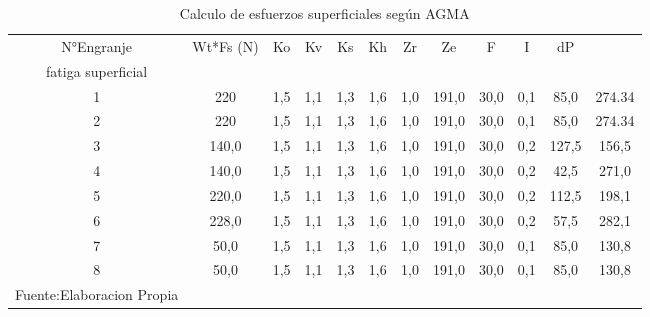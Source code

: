 

\begin{longtable}{|c|c|c|c|c|c|c|c|c|c|c|c|}
\hline
N°Engranje & Wt*Fs (N) & Ko  & Kv  & Ks  & Kh  & Zr  & Ze    & F    & I   & dP    & \begin{tabular}[c]{@{}c@{}}Esfuerzo AGMA\\  fatiga superficial\end{tabular} \\ \hline
1          & 220      & 1,5 & 1,1 & 1,3 & 1,6 & 1,0 & 191,0 & 30,0 & 0,1 & 85,0  & 274.34                                                                       \\ \hline
2          & 220      & 1,5 & 1,1 & 1,3 & 1,6 & 1,0 & 191,0 & 30,0 & 0,1 & 85,0  & 274.34                                                                       \\ \hline
3          & 140,0     & 1,5 & 1,1 & 1,3 & 1,6 & 1,0 & 191,0 & 30,0 & 0,2 & 127,5 & 156,5                                                                       \\ \hline
4          & 140,0     & 1,5 & 1,1 & 1,3 & 1,6 & 1,0 & 191,0 & 30,0 & 0,2 & 42,5  & 271,0                                                                       \\ \hline
5          & 220,0     & 1,5 & 1,1 & 1,3 & 1,6 & 1,0 & 191,0 & 30,0 & 0,2 & 112,5 & 198,1                                                                       \\ \hline
6          & 228,0     & 1,5 & 1,1 & 1,3 & 1,6 & 1,0 & 191,0 & 30,0 & 0,2 & 57,5  & 282,1                                                                       \\ \hline
7          & 50,0      & 1,5 & 1,1 & 1,3 & 1,6 & 1,0 & 191,0 & 30,0 & 0,1 & 85,0  & 130,8                                                                       \\ \hline
8          & 50,0      & 1,5 & 1,1 & 1,3 & 1,6 & 1,0 & 191,0 & 30,0 & 0,1 & 85,0  & 130,8                                                                       \\ \hline

\caption{Calculo de esfuerzos superficiales según AGMA}{Fuente:Elaboracion Propia}
\label{table:fatiga_flec2}
\end{longtable}
